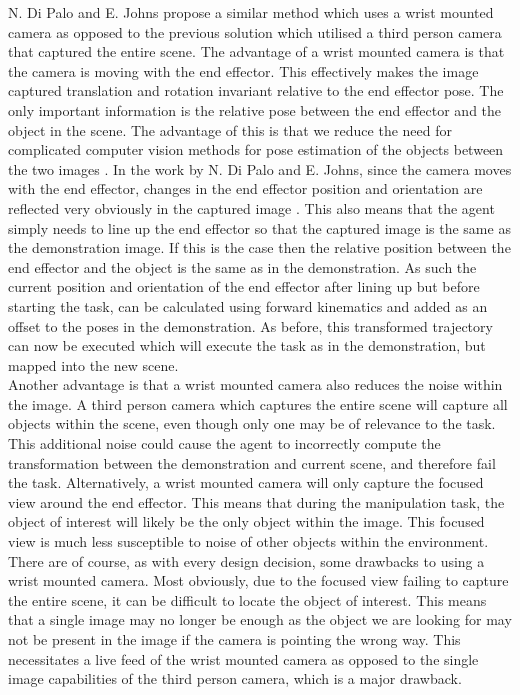 N. Di Palo and E. Johns propose a similar method \cite{one-shot-imitation} which uses a wrist mounted camera as opposed to the previous solution which utilised a third person camera that captured the entire scene. The advantage of a wrist mounted camera is that the camera is moving with the end effector. This effectively makes the image captured translation and rotation invariant relative to the end effector pose. The only important information is the relative pose between the end effector and the object in the scene. The advantage of this is that we reduce the need for complicated computer vision methods for pose estimation of the objects between the two images \cite{one-shot-pose-estimate}. In the work by N. Di Palo and E. Johns, since the camera moves with the end effector, changes in the end effector position and orientation are reflected very obviously in the captured image \cite{one-shot-imitation}. This also means that the agent simply needs to line up the end effector so that the captured image is the same as the demonstration image. If this is the case then the relative position between the end effector and the object is the same as in the demonstration. As such the current position and orientation of the end effector after lining up but before starting the task, can be calculated using forward kinematics and added as an offset to the poses in the demonstration. As before, this transformed trajectory can now be executed which will execute the task as in the demonstration, but mapped into the new scene.\\

Another advantage is that a wrist mounted camera also reduces the noise within the image. A third person camera which captures the entire scene will capture all objects within the scene, even though only one may be of relevance to the task. This additional noise could cause the agent to incorrectly compute the transformation between the demonstration and current scene, and therefore fail the task. Alternatively, a wrist mounted camera will only capture the focused view around the end effector. This means that during the manipulation task, the object of interest will likely be the only object within the image. This focused view is much less susceptible to noise of other objects within the environment.\\

There are of course, as with every design decision, some drawbacks to using a wrist mounted camera. Most obviously, due to the focused view failing to capture the entire scene, it can be difficult to locate the object of interest. This means that a single image may no longer be enough as the object we are looking for may not be present in the image if the camera is pointing the wrong way. This necessitates a live feed of the wrist mounted camera as opposed to the single image capabilities of the third person camera, which is a major drawback.\\

